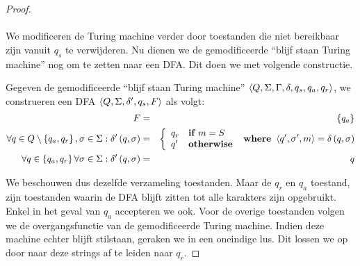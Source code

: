 \documentclass[a4paper]{article}
\begin{document}
\begin{question}
\begin{answer}
\begin{enumerate}
\begin{proof}
\paragraph{}
We modificeren de Turing machine verder door toestanden die niet bereikbaar zijn vanuit $q_s$ te verwijderen. Nu dienen we de gemodificeerde ``blijf staan Turing machine'' nog om te zetten naar een DFA. Dit doen we met volgende constructie.
\begin{construction}
Gegeven de gemodificeerde ``blijf staan Turing machine'' $\left\langle Q,\Sigma,\Gamma,\delta,q_s,q_a,q_r \right\rangle$, we construeren een DFA $\left\langle Q,\Sigma,\delta',q_s,F \right\rangle$ als volgt:
\begin{eqnarray}
F&=&\left\{ q_a \right\}\\
\forall q\in Q\setminus\left\{ q_a,q_r \right\},\sigma\in\Sigma:\delta'\left( q,\sigma \right)&=&\left\{\begin{array}{ll} q_r&\mbox{\bf if } m=S\\q'&\mbox{\bf otherwise} \end{array}\right.\mbox{\bf{ where }}\left\langle q',\sigma',m \right\rangle=\delta\left( q,\sigma \right)\\
\forall q\in\left\{ q_a,q_r \right\}\forall\sigma\in\Sigma:\delta'\left( q,\sigma \right)&=&q
\end{eqnarray}
\end{construction}
We beschouwen dus dezelfde verzameling toestanden. Maar de $q_r$ en $q_a$ toestand, zijn toestanden waarin de DFA blijft zitten tot alle karakters zijn opgebruikt. Enkel in het geval van $q_a$ accepteren we ook. Voor de overige toestanden volgen we de overgangsfunctie van de gemodificeerde Turing machine. Indien deze machine echter blijft stilstaan, geraken we in een oneindige lus. Dit lossen we op door naar deze strings af te leiden naar $q_r$.
\end{proof}
\end{enumerate}
\end{answer}
\end{question}
\end{document}
